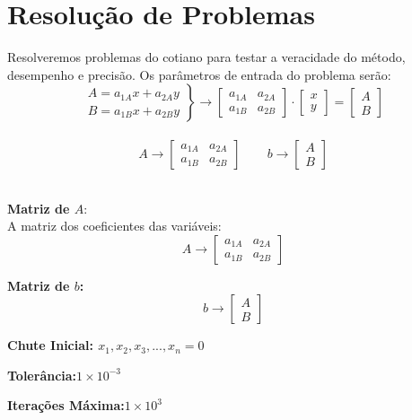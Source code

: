 \documentclass[
	12pt,				%
	openright,			%
	twoside,			%
	a4paper,			%
	english,			%
	french,				%
	spanish,			%
	brazil				%
	]{abntex2_new}
\begin{document}
\chapter{Resolução de Problemas}
Resolveremos problemas do cotiano para testar a veracidade do método, desempenho e
precisão. Os parâmetros de entrada do problema serão:\\
$$\left.\begin{aligned}
A=a_{1A} x + a_{2A} y\\
B=a_{1B} x + a_{2B} y
\end{aligned}
\right\} \rightarrow
\begin{bmatrix}
a_{1A} & a_{2A} \\
a_{1B} & a_{2B}
\end{bmatrix} \cdot
\begin{bmatrix}
x \\
y
\end{bmatrix}
= 
\begin{bmatrix}
A \\
B
\end{bmatrix}
$$\\
$$	A \rightarrow   \begin{bmatrix}
a_{1A} & a_{2A} \\
a_{1B} & a_{2B}
\end{bmatrix} \hspace{25pt}
b \rightarrow  \begin{bmatrix}
A \\
B
\end{bmatrix}
$$\\

\begin{alineas}
	\item{\textbf{Matriz de $A$}:\\
	A matriz dos coeficientes das variáveis:
	 $$A \rightarrow   \begin{bmatrix}
	 a_{1A} & a_{2A} \\
	 a_{1B} & a_{2B}
	 \end{bmatrix}$$}
	\item{\textbf{Matriz de $b$:}
	$$b \rightarrow  \begin{bmatrix}
	A \\
	B
	\end{bmatrix}$$
}
\item{\textbf{Chute Inicial: $x_1,x_2,x_3,...,x_n = 0$}\\

}
\item{\textbf{Tolerância:$1 \times 10^{-3}$}}
\item{\textbf{Iterações Máxima:$1 \times 10^{3}$}}
\end{alineas}
\end{document}
